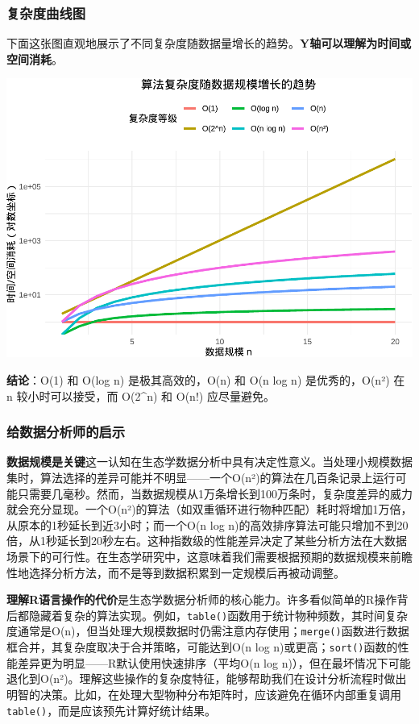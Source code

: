 \documentclass[
]{book}
\begin{document}
\hypertarget{ux590dux6742ux5ea6ux66f2ux7ebfux56fe}{%
\subsubsection{复杂度曲线图}\label{ux590dux6742ux5ea6ux66f2ux7ebfux56fe}}

下面这张图直观地展示了不同复杂度随数据量增长的趋势。\textbf{Y轴可以理解为时间或空间消耗}。

\begin{center}\includegraphics[width=0.8\linewidth]{ecological-statistics_files/figure-latex/unnamed-chunk-3-1} \end{center}

\textbf{结论}：O(1) 和 O(log n) 是极其高效的，O(n) 和 O(n log n) 是优秀的，O(n²) 在 n 较小时可以接受，而 O(2\^{}n) 和 O(n!) 应尽量避免。

\hypertarget{ux7ed9ux6570ux636eux5206ux6790ux5e08ux7684ux542fux793a}{%
\subsubsection{给数据分析师的启示}\label{ux7ed9ux6570ux636eux5206ux6790ux5e08ux7684ux542fux793a}}

\textbf{数据规模是关键}这一认知在生态学数据分析中具有决定性意义。当处理小规模数据集时，算法选择的差异可能并不明显------一个O(n²)的算法在几百条记录上运行可能只需要几毫秒。然而，当数据规模从1万条增长到100万条时，复杂度差异的威力就会充分显现。一个O(n²)的算法（如双重循环进行物种匹配）耗时将增加1万倍，从原本的1秒延长到近3小时；而一个O(n log n)的高效排序算法可能只增加不到20倍，从1秒延长到20秒左右。这种指数级的性能差异决定了某些分析方法在大数据场景下的可行性。在生态学研究中，这意味着我们需要根据预期的数据规模来前瞻性地选择分析方法，而不是等到数据积累到一定规模后再被动调整。

\textbf{理解R语言操作的代价}是生态学数据分析师的核心能力。许多看似简单的R操作背后都隐藏着复杂的算法实现。例如，\texttt{table()}函数用于统计物种频数，其时间复杂度通常是O(n)，但当处理大规模数据时仍需注意内存使用；\texttt{merge()}函数进行数据框合并，其复杂度取决于合并策略，可能达到O(n log n)或更高；\texttt{sort()}函数的性能差异更为明显------R默认使用快速排序（平均O(n log n)），但在最坏情况下可能退化到O(n²)。理解这些操作的复杂度特征，能够帮助我们在设计分析流程时做出明智的决策。比如，在处理大型物种分布矩阵时，应该避免在循环内部重复调用\texttt{table()}，而是应该预先计算好统计结果。
\end{document}
